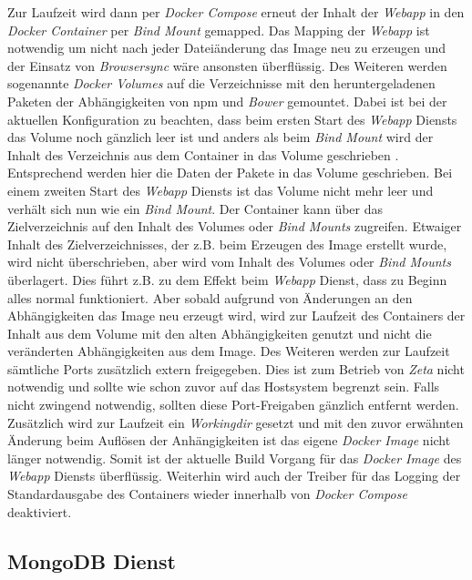 Zur Laufzeit wird dann per \textit{Docker Compose} erneut der Inhalt der \textit{Webapp} in den \textit{Docker Container} per \textit{Bind Mount} gemapped. Das Mapping der \textit{Webapp} ist notwendig um nicht nach jeder Dateiänderung das Image neu zu erzeugen und der Einsatz von \textit{Browsersync} wäre ansonsten überflüssig. Des Weiteren werden sogenannte \textit{Docker Volumes} auf die Verzeichnisse mit den heruntergeladenen Paketen der Abhängigkeiten von \ac{npm} und \textit{Bower} gemountet. Dabei ist bei der aktuellen Konfiguration zu beachten, dass beim ersten Start des \textit{Webapp} Diensts das Volume noch gänzlich leer ist und anders als beim \textit{Bind Mount} wird der Inhalt des Verzeichnis aus dem Container in das Volume geschrieben \cite{docker_storage_tips}. Entsprechend werden hier die Daten der Pakete in das Volume geschrieben. Bei einem zweiten Start des \textit{Webapp} Diensts ist das Volume nicht mehr leer und verhält sich nun wie ein \textit{Bind Mount}. Der Container kann über das Zielverzeichnis auf den Inhalt des Volumes oder \textit{Bind Mounts} zugreifen. Etwaiger Inhalt des Zielverzeichnisses, der z.B. beim Erzeugen des Image erstellt wurde, wird nicht überschrieben, aber wird vom Inhalt des Volumes oder \textit{Bind Mounts} überlagert. Dies führt z.B. zu dem Effekt beim \textit{Webapp} Dienst, dass zu Beginn alles normal funktioniert. Aber sobald aufgrund von Änderungen an den Abhängigkeiten das Image neu erzeugt wird, wird zur Laufzeit des Containers der Inhalt aus dem Volume mit den alten Abhängigkeiten genutzt und nicht die veränderten Abhängigkeiten aus dem Image. Des Weiteren werden zur Laufzeit sämtliche Ports zusätzlich extern freigegeben. Dies ist zum Betrieb von \textit{Zeta} nicht notwendig und sollte wie schon zuvor auf das Hostsystem begrenzt sein. Falls nicht zwingend notwendig, sollten diese Port-Freigaben gänzlich entfernt werden. Zusätzlich wird zur Laufzeit ein \textit{Workingdir} gesetzt und mit den zuvor erwähnten Änderung beim Auflösen der Anhängigkeiten ist das eigene \textit{Docker Image} nicht länger notwendig. Somit ist der aktuelle Build Vorgang für das \textit{Docker Image} des \textit{Webapp} Diensts überflüssig. Weiterhin wird auch der Treiber für das Logging der Standardausgabe des Containers wieder innerhalb von \textit{Docker Compose} deaktiviert.

\subsection{MongoDB Dienst}

